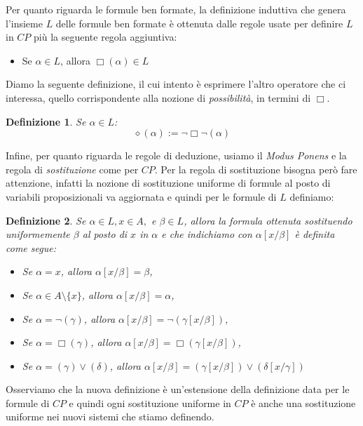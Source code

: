 \documentclass[a4paper, titlepage, 12pt]{report}
\newtheorem{definition}{Definizione}[chapter]
\begin{document}
Per quanto riguarda le formule ben formate, la definizione induttiva che genera l'insieme $L$
delle formule ben formate è ottenuta dalle regole usate per definire $L$ in $CP$ più
la seguente regola aggiuntiva:
\begin{itemize}
\item Se $\alpha \in L$, allora $\Box (\alpha) \in L$
\end{itemize}

Diamo la seguente definizione, il cui intento è esprimere l'altro operatore
che ci interessa, quello corrispondente alla nozione di \emph{possibilità},
in termini di $\Box$.

\begin{definition}
Se $\alpha \in L$:
$$\diamond (\alpha) := \neg \Box \neg (\alpha)$$
\end{definition}

Infine, per quanto riguarda le regole di deduzione,
usiamo il \emph{Modus Ponens} e la regola di \emph{sostituzione}
come per $CP$. Per la regola di sostituzione bisogna però fare attenzione,
infatti la nozione di sostituzione uniforme di formule al posto di variabili
proposizionali va aggiornata e quindi per le formule di $L$ definiamo:

\begin{definition}
Se $\alpha \in L, x \in A,$ e $\beta \in L$, allora la formula
ottenuta sostituendo uniformemente $\beta$ al posto di $x$ in $\alpha$
e che indichiamo con $\alpha[x/\beta]$ è definita come segue:
\begin{itemize}
\item Se $\alpha = x$, allora $\alpha[x/\beta] = \beta$,
\item Se $\alpha \in A \setminus \{x\}$, allora $\alpha[x/\beta] = \alpha$,
\item Se $\alpha = \neg (\gamma)$, allora $\alpha[x/\beta] = \neg (\gamma[x/\beta])$,
\item Se $\alpha = \Box (\gamma)$, allora $\alpha[x/\beta] = \Box (\gamma[x/\beta])$,
\item Se $\alpha = (\gamma) \lor (\delta)$,
      allora $\alpha[x/\beta] = (\gamma[x/\beta]) \lor (\delta[x/\gamma])$
\end{itemize}
\end{definition}

Osserviamo che la nuova definizione è un'estensione della definizione data per le
formule di $CP$ e quindi ogni sostituzione uniforme in $CP$ è anche una sostituzione
uniforme nei nuovi sistemi che stiamo definendo.
\end{document}
